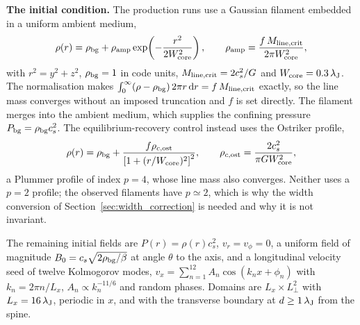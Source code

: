 \documentclass[usenatbib,twoside,twocolumn]{mnras}
\begin{document}
\smallskip\noindent\textbf{The initial condition.} The production runs use a Gaussian filament embedded in a uniform ambient medium,
\begin{equation}
\rho(r)=\rho_{\rm bg}+\rho_{\rm amp}\exp\!\left(-\frac{r^{2}}{2W_{\rm core}^{2}}\right),\qquad
\rho_{\rm amp}=\frac{f\,M_{\rm line,crit}}{2\pi W_{\rm core}^{2}},
\label{eq:ic_gauss}
\end{equation}
with $r^{2}=y^{2}+z^{2}$, $\rho_{\rm bg}=1$ in code units, $M_{\rm line,crit}=2c_s^{2}/G$ and $W_{\rm core}=0.3\,\lambda_{\rm J}$. The normalisation makes $\int_0^\infty(\rho-\rho_{\rm bg})\,2\pi r\,{\rm d}r=f\,M_{\rm line,crit}$ exactly, so the line mass converges without an imposed truncation and $f$ is set directly. The filament merges into the ambient medium, which supplies the confining pressure $P_{\rm bg}=\rho_{\rm bg}c_s^{2}$. The equilibrium-recovery control instead uses the Ostriker profile,
\begin{equation}
\rho(r)=\rho_{\rm bg}+\frac{f\rho_{c,\rm ost}}{\left[1+(r/W_{\rm core})^{2}\right]^{2}},\qquad
\rho_{c,\rm ost}=\frac{2c_s^{2}}{\pi G W_{\rm core}^{2}},
\label{eq:ic_ost}
\end{equation}
a Plummer profile of index $p=4$, whose line mass also converges. Neither uses a $p=2$ profile; the observed filaments have $p\simeq2$, which is why the width conversion of Section~\ref{sec:width_correction} is needed and why it is not invariant.

The remaining initial fields are $P(r)=\rho(r)c_s^{2}$, $v_r=v_\phi=0$, a uniform field of magnitude $B_0=c_s\sqrt{2\rho_{\rm bg}/\beta}$ at angle $\theta$ to the axis, and a longitudinal velocity seed of twelve Kolmogorov modes, $v_x=\sum_{n=1}^{12}A_n\cos(k_nx+\phi_n)$ with $k_n=2\pi n/L_x$, $A_n\propto k_n^{-11/6}$ and random phases. Domains are $L_x\times L_\perp^{2}$ with $L_x=16\,\lambda_{\rm J}$, periodic in $x$, and with the transverse boundary at $d\geq1\,\lambda_{\rm J}$ from the spine.
\end{document}
